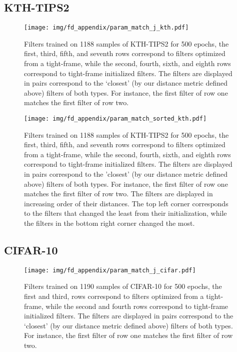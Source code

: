 \documentclass[10pt,twocolumn,letterpaper]{article}
\begin{document}
\begin{table*}[t]
\subsection{KTH-TIPS2}
\begin{figure}[H]
    \centering
    \texttt{[image: img/fd\_appendix/param\_match\_j\_kth.pdf]}
    \vspace{-50pt}
    \caption{Filters trained on 1188 samples of KTH-TIPS2 for 500 epochs, the first, third, fifth, and seventh rows correspond to filters optimized from a tight-frame, while the second, fourth, sixth, and eighth rows correspond to tight-frame initialized filters. The filters are displayed in pairs correspond to the `closest' (by our distance metric defined above) filters of both types. For instance, the first filter of row one matches the first filter of row two.}
    \label{fig:kthj}
\end{figure}
\clearpage
\begin{figure}[H]
    \centering
    \texttt{[image: img/fd\_appendix/param\_match\_sorted\_kth.pdf]}
    \vspace{-50pt}
    \caption{Filters trained on 1188 samples of KTH-TIPS2 for 500 epochs, the first, third, fifth, and seventh rows correspond to filters optimized from a tight-frame, while the second, fourth, sixth, and eighth rows correspond to tight-frame initialized filters. The filters are displayed in pairs correspond to the 'closest' (by our distance metric defined above) filters of both types. For instance, the first filter of row one matches the first filter of row two. The filters are displayed in increasing order of their distances. The top left corner corresponds to the filters that changed the least from their initialization, while the filters in the bottom right corner changed the most.}
    \label{fig:kthsorted}
\end{figure}

\subsection{CIFAR-10}
\begin{figure}[H]
    \centering
    \texttt{[image: img/fd\_appendix/param\_match\_j\_cifar.pdf]}
    \vspace{-30pt}
    \caption{Filters trained on 1190 samples of CIFAR-10 for 500 epochs, the first and third,  rows correspond to filters optimized from a tight-frame, while the second and fourth rows correspond to tight-frame initialized filters. The filters are displayed in pairs correspond to the `closest' (by our distance metric defined above) filters of both types. For instance, the first filter of row one matches the first filter of row two.}
    \label{fig:cifarj}
\end{figure}


\end{table*}
\end{document}
